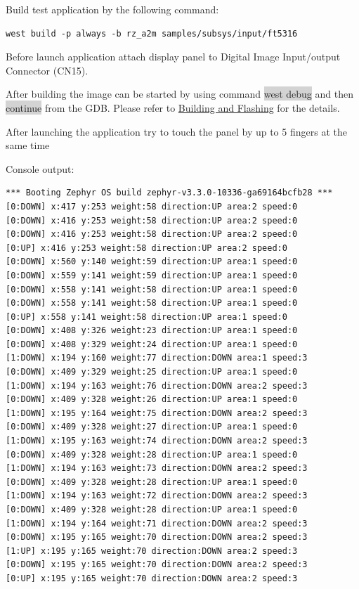 \documentclass[11pt,a4paper,oneside]{article}
\begin{document}
Build test application by the following command:
\begin{lstlisting}
west build -p always -b rz_a2m samples/subsys/input/ft5316
\end{lstlisting}

Before launch application attach display panel to Digital Image Input/output Connector (CN15).

After building the image can be started by using command \colorbox{lightgray}{west debug}
and then \colorbox{lightgray}{continue} from the GDB. Please refer to
\hyperref[building-and-flashing]{Building and Flashing} for the
details.

After launching the application try to touch the panel by up to 5 fingers at the same time

Console output:

\begin{lstlisting}
*** Booting Zephyr OS build zephyr-v3.3.0-10336-ga69164bcfb28 ***
[0:DOWN] x:417 y:253 weight:58 direction:UP area:2 speed:0
[0:DOWN] x:416 y:253 weight:58 direction:UP area:2 speed:0
[0:DOWN] x:416 y:253 weight:58 direction:UP area:2 speed:0
[0:UP] x:416 y:253 weight:58 direction:UP area:2 speed:0
[0:DOWN] x:560 y:140 weight:59 direction:UP area:1 speed:0
[0:DOWN] x:559 y:141 weight:59 direction:UP area:1 speed:0
[0:DOWN] x:558 y:141 weight:58 direction:UP area:1 speed:0
[0:DOWN] x:558 y:141 weight:58 direction:UP area:1 speed:0
[0:UP] x:558 y:141 weight:58 direction:UP area:1 speed:0
[0:DOWN] x:408 y:326 weight:23 direction:UP area:1 speed:0
[0:DOWN] x:408 y:329 weight:24 direction:UP area:1 speed:0
[1:DOWN] x:194 y:160 weight:77 direction:DOWN area:1 speed:3
[0:DOWN] x:409 y:329 weight:25 direction:UP area:1 speed:0
[1:DOWN] x:194 y:163 weight:76 direction:DOWN area:2 speed:3
[0:DOWN] x:409 y:328 weight:26 direction:UP area:1 speed:0
[1:DOWN] x:195 y:164 weight:75 direction:DOWN area:2 speed:3
[0:DOWN] x:409 y:328 weight:27 direction:UP area:1 speed:0
[1:DOWN] x:195 y:163 weight:74 direction:DOWN area:2 speed:3
[0:DOWN] x:409 y:328 weight:28 direction:UP area:1 speed:0
[1:DOWN] x:194 y:163 weight:73 direction:DOWN area:2 speed:3
[0:DOWN] x:409 y:328 weight:28 direction:UP area:1 speed:0
[1:DOWN] x:194 y:163 weight:72 direction:DOWN area:2 speed:3
[0:DOWN] x:409 y:328 weight:28 direction:UP area:1 speed:0
[1:DOWN] x:194 y:164 weight:71 direction:DOWN area:2 speed:3
[0:DOWN] x:195 y:165 weight:70 direction:DOWN area:2 speed:3
[1:UP] x:195 y:165 weight:70 direction:DOWN area:2 speed:3
[0:DOWN] x:195 y:165 weight:70 direction:DOWN area:2 speed:3
[0:UP] x:195 y:165 weight:70 direction:DOWN area:2 speed:3

\end{lstlisting}
\end{document}
